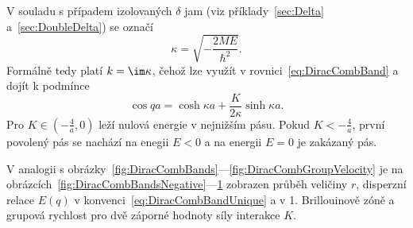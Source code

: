 \begin{solution}
\begin{enumerate}
        \begin{figure}[!htbp]
            \begin{subfigure}{0.49\linewidth}
                \centering{}
            \end{subfigure}
            \hfill
            \begin{subfigure}{0.49\linewidth}
                \centering{}
            \end{subfigure}
            \begin{subfigure}{0.49\linewidth}
                \centering{}
            \end{subfigure}
            \hfill
            \begin{subfigure}{0.49\linewidth}
                \centering{}
            \end{subfigure}
            \label{fig:DiracCombGroupVelocityNegative}
        \end{figure}

        V souladu s případem izolovaných $\delta$ jam (viz příklady~\ref{sec:Delta} a~\ref{sec:DoubleDelta}) se označí
        \begin{equation}
            \kappa=\sqrt{-\frac{2ME}{\hbar^{2}}}.
        \end{equation}
        Formálně tedy platí $k=\im\kappa$, čehož lze využít v rovnici~\eqref{eq:DiracCombBand} a dojít k podmínce
        \begin{equation}\label{eq:DiracCombBandNegative}
            \boxed{\cos{qa}=\cosh{\kappa a}+\frac{K}{2\kappa}\sinh{\kappa a}}.
        \end{equation}
        Pro $K\in(-\frac{4}{a},0)$ leží nulová energie v nejnižším pásu.
        Pokud $K<-\frac{4}{a}$, první povolený pás se nachází na enegii $E<0$ a na energii $E=0$ je zakázaný pás.
        
        V analogii s obrázky~\ref{fig:DiracCombBands}---\ref{fig:DiracCombGroupVelocity} je na obrázcích~\ref{fig:DiracCombBandsNegative}---\ref{fig:DiracCombGroupVelocityNegative} zobrazen průběh veličiny $r$, disperzní relace $E(q)$ v konvenci~\eqref{eq:DiracCombBandUnique} a v 1. Brillouinově zóně a grupová rychlost pro dvě záporné hodnoty síly interakce $K$.

    \end{enumerate}
\end{solution}

